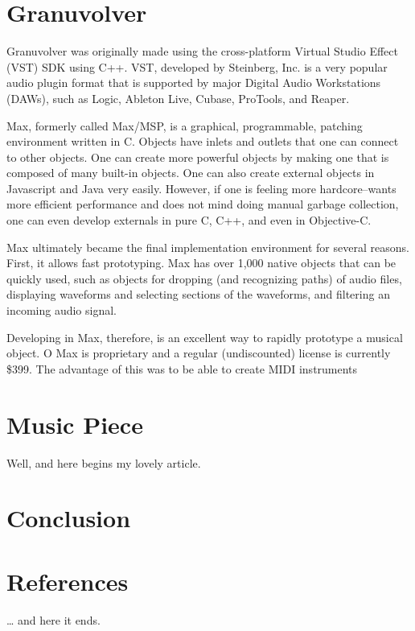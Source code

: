 \documentclass{article}
\begin{document}
\section{Granuvolver}

	Granuvolver was originally made using the cross-platform Virtual Studio Effect (VST) SDK using C++. VST, developed by Steinberg, Inc. is a very popular audio plugin format that is supported by major Digital Audio Workstations (DAWs), such as Logic, Ableton Live, Cubase, ProTools, and Reaper.  

	Max, formerly called Max/MSP, is a graphical, programmable, patching environment written in C.  Objects have inlets and outlets that one can connect to other objects. One can create more powerful objects by making one that is composed of many built-in objects. One can also create external objects in Javascript and Java very easily. However, if one is feeling more hardcore--wants more efficient performance and does not mind doing manual garbage collection, one can even develop externals in pure C, C++, and even in Objective-C. 

  Max ultimately became the final implementation environment for several reasons. First, it allows fast prototyping. Max has over 1,000 native objects that can be quickly used, such as objects for dropping (and recognizing paths) of audio files, displaying waveforms and selecting sections of the waveforms, and filtering an incoming audio signal. 


	Developing in Max, therefore, is an excellent way to rapidly prototype a musical object. O
	 Max is proprietary and a regular (undiscounted) license is currently \$399.
	The advantage of this was to be able to create MIDI instruments 
\section{Music Piece}
Well, and here begins my lovely article.
\section{Conclusion}
\section{References}
\ldots{} and here it ends.
\end{document}
